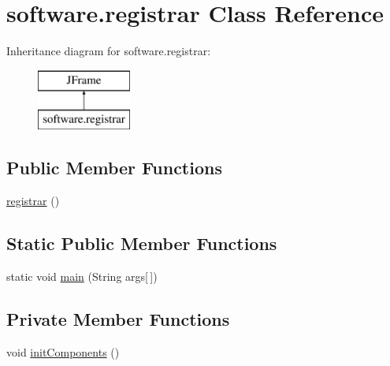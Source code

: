 \hypertarget{classsoftware_1_1registrar}{}\section{software.\+registrar Class Reference}
\label{classsoftware_1_1registrar}
Inheritance diagram for software.\+registrar\+:\begin{figure}[H]
\begin{center}
\leavevmode
\includegraphics[height=2.000000cm]{classsoftware_1_1registrar}
\end{center}
\end{figure}
\subsection*{Public Member Functions}
\begin{DoxyCompactItemize}
\item 
\mbox{\hyperlink{classsoftware_1_1registrar_a0960abe4e8b2d8f5a2c945ce37b280db}{registrar}} ()
\end{DoxyCompactItemize}
\subsection*{Static Public Member Functions}
\begin{DoxyCompactItemize}
\item 
static void \mbox{\hyperlink{classsoftware_1_1registrar_a2a5f3499b73d8cb0b16f8487a80d056f}{main}} (String args\mbox{[}$\,$\mbox{]})
\end{DoxyCompactItemize}
\subsection*{Private Member Functions}
\begin{DoxyCompactItemize}
\item 
void \mbox{\hyperlink{classsoftware_1_1registrar_a4a44ac73e408828398224b3b183152d6}{init\+Components}} ()
\end{DoxyCompactItemize}
